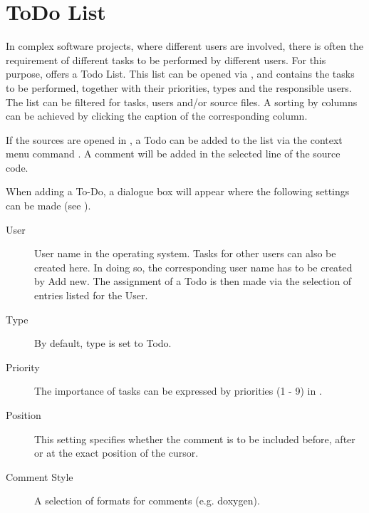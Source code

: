 \section{ToDo List}\label{sec:todo_list}

In complex software projects, where different users are involved, there is often the requirement of different tasks to be performed by different users. For this purpose, \codeblocks offers a Todo List. This list can be opened via , and contains the tasks to be performed, together with their priorities, types and the responsible users. The list can be filtered for tasks, users and/or source files. A sorting by columns can be achieved by clicking the caption of the corresponding column.



If the sources are opened in \codeblocks, a Todo can be added to the list via the context menu command . A comment will be added in the selected line of the source code.


When adding a To-Do, a dialogue box will appear where the following settings can be made (see ).


\begin{description}
\item[User] User name  in the operating system. Tasks for other users can also be created here. In doing so, the corresponding user name has to be created by Add new. The assignment of a Todo is then made via the selection of entries listed for the User.

\item[Type] By default, type is set to Todo.
\item[Priority] The importance of tasks can be expressed by priorities (1 - 9) in \codeblocks.
\item[Position] This setting specifies whether the comment is to be included before, after or at the exact position of the cursor.
\item[Comment Style] A selection of formats for comments (e.g. doxygen).
\end{description}

